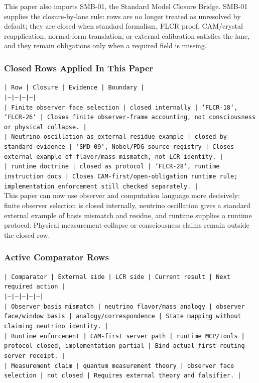 \documentclass[11pt]{article}
\begin{document}
This paper also imports SMB-01, the Standard Model Closure Bridge. SMB-01 supplies the closure-by-lane rule: rows are no longer treated as unresolved by default; they are closed when standard formalism, FLCR proof, CAM/crystal reapplication, normal-form translation, or external calibration satisfies the lane, and they remain obligations only when a required field is missing.

\subsubsection*{Closed Rows Applied In This Paper}

\noindent\texttt{| Row | Closure | Evidence | Boundary |}\\
\noindent\texttt{|---|---|---|---|}\\
\noindent\texttt{| Finite observer face selection | closed internally | `FLCR-18`, `FLCR-26` | Closes finite observer-frame accounting, not consciousness or physical collapse. |}\\
\noindent\texttt{| Neutrino oscillation as external residue example | closed by standard evidence | `SMD-09`, Nobel/PDG source registry | Closes external example of flavor/mass mismatch, not LCR identity. |}\\
\noindent\texttt{| runtime doctrine | closed as protocol | `FLCR-28`, runtime instruction docs | Closes CAM-first/open-obligation runtime rule; implementation enforcement still checked separately. |}\\

This paper can now use observer and computation language more decisively: finite observer selection is closed internally, neutrino oscillation gives a standard external example of basis mismatch and residue, and runtime supplies a runtime protocol. Physical measurement-collapse or consciousness claims remain outside the closed row.

\subsubsection*{Active Comparator Rows}

\noindent\texttt{| Comparator | External side | LCR side | Current result | Next required action |}\\
\noindent\texttt{|---|---|---|---|---|}\\
\noindent\texttt{| Observer basis mismatch | neutrino flavor/mass analogy | observer face/window basis | analogy/correspondence | State mapping without claiming neutrino identity. |}\\
\noindent\texttt{| Runtime enforcement | CAM-first server path | runtime MCP/tools | protocol closed, implementation partial | Bind actual first-routing server receipt. |}\\
\noindent\texttt{| Measurement claim | quantum measurement theory | observer face selection | not closed | Requires external theory and falsifier. |}\\
\end{document}
